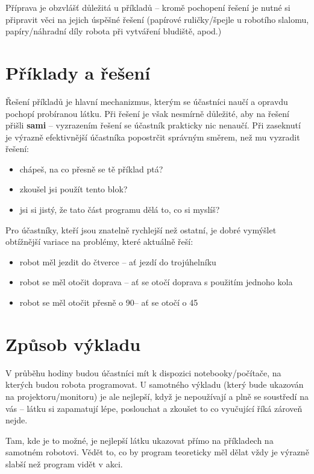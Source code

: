 Příprava je obzvlášť důležitá u příkladů -- kromě pochopení řešení je nutné si připravit věci na jejich úspěšné řešení (papírové ruličky/špejle u robotího slalomu, papíry/náhradní díly robota při vytváření bludiště, apod.)

\section{Příklady a řešení}
Řešení příkladů je hlavní mechanizmus, kterým se účastníci naučí a opravdu pochopí probíranou látku. Při řešení je však nesmírně důležité, aby na řešení přišli \textbf{sami} -- vyzrazením řešení se účastník prakticky nic nenaučí. Při zaseknutí je výrazně efektivnější účastníka popostrčit správným směrem, než mu vyzradit řešení:
\begin{itemize}
	\item chápeš, na co přesně se tě příklad ptá?
	\item zkoušel jsi použít tento blok?
	\item jsi si jistý, že tato část programu dělá to, co si myslíš?
\end{itemize}

\vspace{\baselineskip}

Pro účastníky, kteří jsou znatelně rychlejší než ostatní, je dobré vymýšlet obtížnější variace na problémy, které aktuálně řeší:
\begin{itemize}
	\item robot měl jezdit do čtverce -- ať jezdí do trojúhelníku
	\item robot se měl otočit doprava -- ať se otočí doprava s použitím jednoho kola
	\item robot se měl otočit přesně o 90\degree -- ať se otočí o 45\degree
\end{itemize}

\section{Způsob výkladu}
V průběhu hodiny budou účastníci mít k dispozici notebooky/počítače, na kterých budou robota programovat. U samotného výkladu (který bude ukazován na projektoru/monitoru) je ale nejlepší, když je nepoužívají a plně se soustředí na vás -- látku si zapamatují lépe, poslouchat a zkoušet to co vyučující říká zároveň nejde.

Tam, kde je to možné, je nejlepší látku ukazovat přímo na příkladech na samotném robotovi. Vědět to, co by program teoreticky měl dělat vždy je výrazně slabší než program vidět v akci.

